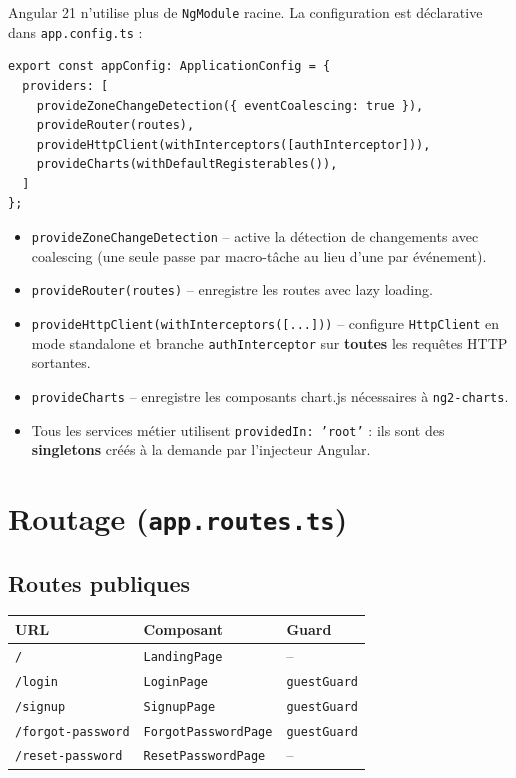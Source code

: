 \documentclass[12pt,a4paper]{article}
\begin{document}
Angular 21 n'utilise plus de \texttt{NgModule} racine.
La configuration est déclarative dans \texttt{app.config.ts} :

\begin{lstlisting}
export const appConfig: ApplicationConfig = {
  providers: [
    provideZoneChangeDetection({ eventCoalescing: true }),
    provideRouter(routes),
    provideHttpClient(withInterceptors([authInterceptor])),
    provideCharts(withDefaultRegisterables()),
  ]
};
\end{lstlisting}

\begin{itemize}
  \item \texttt{provideZoneChangeDetection} -- active la détection de changements avec
        coalescing (une seule passe par macro-tâche au lieu d'une par événement).
  \item \texttt{provideRouter(routes)} -- enregistre les routes avec lazy loading.
  \item \texttt{provideHttpClient(withInterceptors([...]))} -- configure
        \texttt{HttpClient} en mode standalone et branche \texttt{authInterceptor}
        sur \textbf{toutes} les requêtes HTTP sortantes.
  \item \texttt{provideCharts} -- enregistre les composants chart.js nécessaires
        à \texttt{ng2-charts}.
  \item Tous les services métier utilisent \texttt{providedIn: 'root'} : ils sont
        des \textbf{singletons} créés à la demande par l'injecteur Angular.
\end{itemize}

\section{Routage (\texttt{app.routes.ts})}

\subsection{Routes publiques}

\begin{center}
\begin{tabular}{L{5cm} L{6cm} L{3cm}}
\toprule
\textbf{URL} & \textbf{Composant} & \textbf{Guard} \\
\midrule
\texttt{/} & \texttt{LandingPage} & -- \\
\texttt{/login} & \texttt{LoginPage} & \texttt{guestGuard} \\
\texttt{/signup} & \texttt{SignupPage} & \texttt{guestGuard} \\
\texttt{/forgot-password} & \texttt{ForgotPasswordPage} & \texttt{guestGuard} \\
\texttt{/reset-password} & \texttt{ResetPasswordPage} & -- \\
\bottomrule
\end{tabular}
\end{center}
\end{document}
